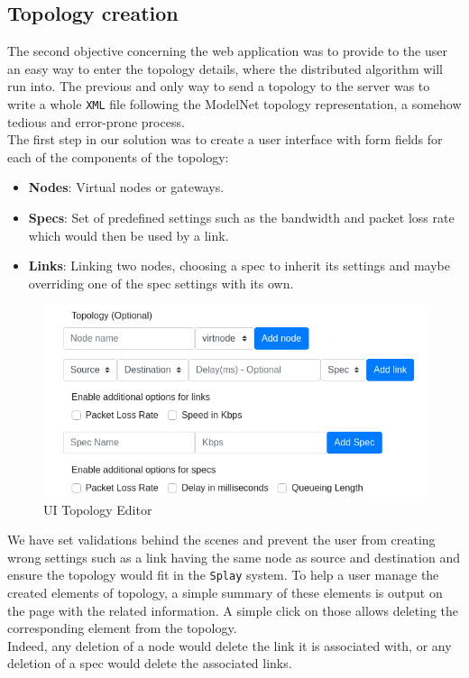 \documentclass{eplmastersthesis}
\begin{document}
      \subsection{Topology creation}

        The second objective concerning the web application was to provide to the
        user an easy way to enter the topology details, where the distributed algorithm
        will run into. The previous and only way to send a topology
        to the server was to write a whole \texttt{XML} file following the ModelNet
        topology representation, a somehow tedious and error-prone process.\\

        The first step in our solution was to create a user interface with
        form fields for each of the components of the topology:

        \begin{itemize}
          \item \textbf{Nodes}: Virtual nodes or gateways.
          \item \textbf{Specs}: Set of predefined settings such as the
          bandwidth and packet loss rate which would then be used by
          a link.
          \item \textbf{Links}: Linking two nodes, choosing a spec to
          inherit its settings and maybe overriding one of the spec settings
          with its own.
        \end{itemize}

        \begin{figure}[H]
          \centering
          \includegraphics[scale=0.6]{figures/editor_topology.png}
          \caption{\label{editor_topology} UI Topology Editor}
        \end{figure}

        We have set validations behind the scenes and
        prevent the user from creating wrong settings such as a link having the
        same node as source and destination and ensure the topology would
        fit in the \texttt{Splay} system. To help a user manage the created
        elements of topology, a simple summary of these elements is
        output on the page with the related information. A simple click on those
        allows deleting the corresponding element from the topology.\\
        Indeed, any deletion of a node would delete the link it is associated
        with, or any deletion of a spec would delete the associated links.\\
\end{document}
